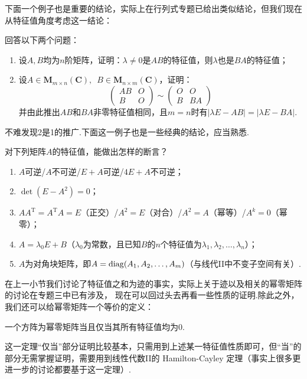 下面一个例子也是重要的结论，实际上在行列式专题已给出类似结论，但我们现在从特征值角度考虑这一结论：
\begin{example}
    回答以下两个问题：
    \begin{enumerate}
        \item 设$A,B$均为$n$阶矩阵，证明：$\lambda\neq 0$是$AB$的特征值，则$\lambda$也是$BA$的特征值；

        \item 设$A\in \mathbf{M}_{m\times n}(\mathbf{C}),\enspace B\in \mathbf{M}_{n\times m}(\mathbf{C})$，证明：
        \[ \begin{pmatrix}
            AB & O \\ B & O
        \end{pmatrix}\sim\begin{pmatrix}
            O & O \\ B & BA
        \end{pmatrix} \]
        并由此推出$AB$和$BA$非零特征值相同，且$m=n$时有$|\lambda E-AB|=|\lambda E-BA|$.
    \end{enumerate}
\end{example}
不难发现2是1的推广.下面这一例子也是一些经典的结论，应当熟悉.
\begin{example}
    对下列矩阵$A$的特征值，能做出怎样的断言？
    \begin{enumerate}
        \item $A$可逆/$A$不可逆/$E+A$可逆/$4E+A$不可逆；

        \item $\det(E-A^2)=0$；

        \item $AA^\mathrm{T}=A^\mathrm{T}A=E$（正交）/$A^2=E$（对合）/$A^2=A$（幂等）/$A^k=0$（幂零）；

        \item $A=\lambda_0E+B$（$\lambda_0$为常数，且已知$B$的$n$个特征值为$\lambda_1,\lambda_2,\ldots,\lambda_n$）；

        \item $A$为对角块矩阵，即$A=\operatorname{diag}(A_1,A_2,\ldots,A_m)$（与线代II中不变子空间有关）.
    \end{enumerate}
\end{example}
在上一小节我们讨论了特征值之和为迹的事实，实际上关于迹以及相关的幂零矩阵的讨论在专题三中已有涉及，
现在可以回过头去再看一些性质的证明.除此之外，我们还可以给幂零矩阵一个等价的定义：
\begin{theorem}
    一个方阵为幂零矩阵当且仅当其所有特征值均为0.
\end{theorem}
这一定理``仅当''部分证明比较基本，只需用到上述某一特征值性质即可，但``当''的部分无需掌握证明，需要用到线性代数II的
Hamilton-Cayley 定理（事实上很多更进一步的讨论都要基于这一定理）.
